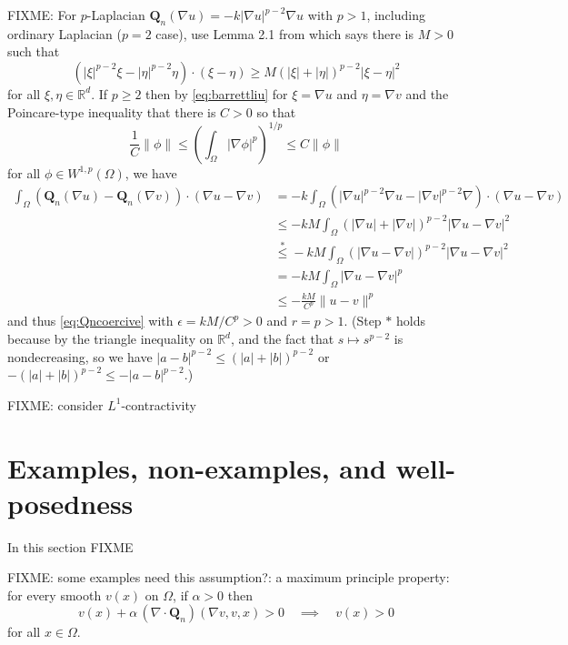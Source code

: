 \documentclass[final,leqno,onefignum,onetabnum]{siamltex1213bueler}
\newcommand\bQ{\mathbf{Q}}
\newcommand{\Div}{\nabla\cdot}
\newcommand\eps{\epsilon}
\renewcommand{\grad}{\nabla}
\newcommand\RR{\mathbb{R}}
\begin{document}
FIXME: For $p$-Laplacian $\bQ_n(\grad u) = - k |\grad u|^{p-2} \grad u$ with $p>1$, including ordinary Laplacian ($p=2$ case), use Lemma 2.1 from \cite{BarrettLiu1993} which says there is $M>0$ such that
\begin{equation}
    (|\xi|^{p-2}\xi - |\eta|^{p-2}\eta)\cdot (\xi - \eta) \ge M \left(|\xi|+|\eta|\right)^{p-2} |\xi-\eta|^2  \label{eq:barrettliu}
\end{equation}
for all $\xi,\eta\in\RR^d$.  If $p\ge 2$ then by \eqref{eq:barrettliu} for $\xi = \grad u$ and $\eta = \grad v$ and the Poincare-type inequality that there is $C>0$ so that
  $$\frac{1}{C} \|\phi\| \le \left(\int_\Omega |\grad \phi|^p\right)^{1/p} \le C \|\phi\|$$
for all $\phi\in W^{1,p}(\Omega)$, we have
\begin{align*}
\int_\Omega \left(\bQ_n(\grad u) - \bQ_n(\grad v)\right)\cdot (\grad u - \grad v) &= -k  \int_\Omega \left(|\grad u|^{p-2} \grad u - |\grad v|^{p-2} \grad \right)\cdot (\grad u - \grad v) \\
  &\le - k M  \int_\Omega \left(|\grad u| + |\grad v|\right)^{p-2} |\grad u - \grad v|^2 \\
  &\stackrel{\ast}{\le} - k M  \int_\Omega \left(|\grad u - \grad v|\right)^{p-2} |\grad u - \grad v|^2 \\
  &= - k M  \int_\Omega |\grad u - \grad v|^p \\
  &\le - \frac{k M}{C^p} \|u-v\|^p
\end{align*}
and thus \eqref{eq:Qncoercive} with $\eps = kM/C^p > 0$ and $r=p>1$.  (Step $\ast$ holds because by the triangle inequality on $\RR^d$, and the fact that $s\mapsto s^{p-2}$ is nondecreasing, so we have $|a-b|^{p-2} \le (|a| + |b|)^{p-2}$ or $-(|a| + |b|)^{p-2} \le - |a-b|^{p-2}$.)

FIXME: consider $L^1$-contractivity


\section{Examples, non-examples, and well-posedness} \label{sec:examples}

In this section FIXME

FIXME: some examples need this assumption?: a maximum principle property: for every smooth $v(x)$ on $\Omega$, if $\alpha>0$ then
\begin{equation}
v(x) + \alpha\, (\Div \bQ_n)(\grad v,v,x) > 0 \quad \implies \quad v(x) > 0 \label{eq:maxprincQn}
\end{equation}
for all $x\in\Omega$.
\end{document}
